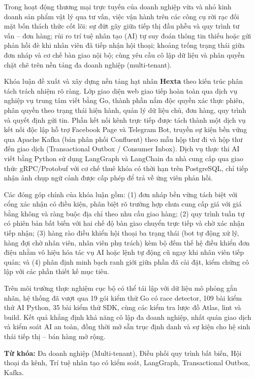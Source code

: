 
Trong hoạt động thương mại trực tuyến của doanh nghiệp vừa và nhỏ kinh doanh sản phẩm vật lý qua tư vấn, việc vận hành trên các công cụ rời rạc đối mặt bốn thách thức cốt lõi: sự đứt gãy giữa tiếp thị đầu phễu và quy trình tư vấn -- đơn hàng; rủi ro trí tuệ nhân tạo (AI) tự suy đoán thông tin thiếu hoặc gửi phản hồi đè khi nhân viên đã tiếp nhận hội thoại; khoảng trống trạng thái giữa đơn nháp và cơ chế bàn giao nội bộ; cùng yêu cầu cô lập dữ liệu và phân quyền chặt chẽ trên nền tảng đa doanh nghiệp (multi-tenant).

Khóa luận đề xuất và xây dựng nền tảng hạt nhân \textbf{Hexta} theo kiến trúc phân tách trách nhiệm rõ ràng. Lớp giao diện web giao tiếp hoàn toàn qua dịch vụ nghiệp vụ trung tâm viết bằng Go, thành phần nắm độc quyền xác thực phiên, phân quyền theo trạng thái hiện hành, quản lý dữ liệu chủ, đơn hàng, quy trình và quyết định gửi tin. Phần kết nối kênh trực tiếp được tách thành một dịch vụ kết nối độc lập hỗ trợ Facebook Page và Telegram Bot, truyền sự kiện bền vững qua Apache Kafka (bản phân phối Confluent) theo mẫu hộp thư đi và hộp thư đến giao dịch (Transactional Outbox / Consumer Inbox). Dịch vụ thực thi AI viết bằng Python sử dụng LangGraph và LangChain đa nhà cung cấp qua giao thức gRPC/Protobuf với cơ chế thuê khóa có thời hạn trên PostgreSQL, chỉ tiếp nhận ảnh chụp ngữ cảnh được cấp phép để trả về ứng viên phản hồi.

Các đóng góp chính của khóa luận gồm: (1) đơn nháp bền vững tách biệt với cổng xác nhận có điều kiện, phân biệt rõ trường hợp chưa cung cấp giá với giá bằng không và ràng buộc địa chỉ theo nhu cầu giao hàng; (2) quy trình tuần tự có phiên bản bất biến với hai chế độ bàn giao chuyển trực tiếp và chờ xác nhận tiếp nhận; (3) hàng rào điều khiển hội thoại ba trạng thái (bot tự động xử lý, hàng đợi chờ nhân viên, nhân viên phụ trách) kèm bộ đếm thế hệ điều khiển đơn điệu nhằm vô hiệu hóa tác vụ AI hoặc lệnh tự động cũ ngay khi nhân viên tiếp quản; và (4) phân định minh bạch ranh giới giữa phần đã cài đặt, kiểm chứng cô lập với các phần thiết kế mục tiêu.

Trên môi trường thực nghiệm cục bộ có thể tái lập với dữ liệu mô phỏng gắn nhãn, hệ thống đã vượt qua 19 gói kiểm thử Go có race detector, 109 bài kiểm thử AI Python, 35 bài kiểm thử SDK, cùng các kiểm tra lược đồ Atlas, lint và build. Kết quả khẳng định khả năng cô lập đa doanh nghiệp, nhất quán giao dịch và kiểm soát AI an toàn, đồng thời mở sẵn trục định danh và sự kiện cho hệ sinh thái tiếp thị -- bán hàng mở rộng.

\medskip
\noindent\textbf{Từ khóa:} Đa doanh nghiệp (Multi-tenant), Điều phối quy trình bất biến, Hội thoại đa kênh, Trí tuệ nhân tạo có kiểm soát, LangGraph, Transactional Outbox, Kafka.
